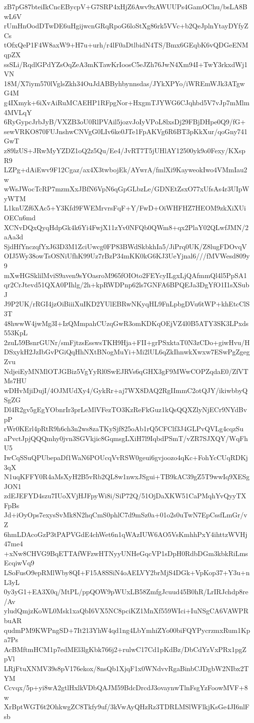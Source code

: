 zB7pG87bteiIkCncEBycpV+G7SRP4xHjZ6Awv9xAWUUPs4GamOChu/bsLA8BwL6V
rUmHnOodDTwDE6uHgijwcnGRqRpoG6loStXg86rk5VVc+b2QeJplnYtayDYfyZCs
tOfxQeP1F4W8axW9+H7u+urh/r4lF0aDtlbidN4TS/Bmx6GEqbK6vQDGeENMqpZX
ssSLi/RqdlGPdYZsOqZeA3mKTawKrIoosC5eJZh76JwN4Xm94I+TwY3rkxdWj1VN
18M/X7iym570lVglsZkh34OuJdABByhbynnsdas/JYkXPYo/iWREmWJk3ATgwG4M
g4IXmyk+6iXvAiRuMCAEHP1RFpgNor+HxgmTJYWG6CJqhbd5V7vJp7mMlm4MVLqY
6RyGypcJrbJyB/VXZB3oU0RlPVAil5jozvJoIyVPoL8lxsDj29FBjDHpe0Q9/fG+
sewVRKO870FUJnshwCNVgG0LIv6ke0JTe1FpAKVg6R6BT3pKkXur/qoGny741GwT
z89lzUS+JRwMyYZDZ1oQ2z5Qu/Ee4/JvRT7T5jUHlAY12500yk9o0Fexy/KXspR9
LZPg+dAiEwv9F12Cgaz/ax4X3twbojEk/AYwrA/fmlXi9KayweokIwo4VMmIau2w
wWsJWocTcRP7mzmXxJBfN6VpN6qGpGLbzLe/GDNEtZsxO77xUfsAs4r3UIpWyWTM
L1knUZf6XAc5+Y3Kfd9FWEMrvrsFqF+Y/FwD+OiWHFHZ7HEOM9zkXiXUiOECn6md
XCNvDQxQyqHdpGk4k6Yi4FwjX11zYv0NFQb0QWm8+qx2PlaY02QLwfJMN/2aAa3d
SjdHfYnczqfYxJ63D3M1ZciUwcg0FP83BWdSkbkhIa5/JiPrq0UK/Z8lugFDOvqV
OIJ5Wy38owTsOSNiUfhK99Uz7rBzP34mKK0kG6KJ3UeYjnal6///fMVWesd809y9
mXwHGSklilMviS9aven9sYOasroM965fOIOto2FEYcyILgxLjQAfmmQl4l5PpSA1
qr2CrJtevd51QXA0PIhlg/2h+kpRWDPnp62ls7GNFA6BPQEJa3DgYfO1I1sXSubJ
J9P2UK/rRGI4jzOiBiiiXuIKD2YUlEBRwNKyqHL9FnLpbgDVu6tWP+khEtcClS3T
48hwwW4jwMg3I+IzQMmpahCUzqGwR3omKDKqOEjVZ4l0B5ATY3SK3LPxds553KpL
2zuL59BsnrGUNr/smFjtzsEsswsTKH9Hja+FII+grPSxktaT0N3zCDo+giwHvu/H
DSxykH2JzIbGvPGiQqHhNXtBNogMuYi+Mi2lUL6qZkIhnwkXwxw7ESwPgZgegZvu
NdjeiEyMNMlOTJGBiz5VgYyRl0SwEJRVs6qGHX3gF9MWwCOPZqdaE0/ZfVTMs7HU
wDHvMjiDujI/4OJMUdXy4/GykRr+aj7WX8DAQ2RgIImmC2otQJY/ikiwbbyQSgZG
Dl4R2gv5gEgYObnrIr3prLeMlVFezTO3KzReFkGuz1kQsQQXZlyNjECr9NYdBvpP
rWr0KErl4pRtR9h6ch3n2ws8zaTKySjf825oAb1rQ5CFClf3J4GLPvQVLg4cqzSu
aPvctJpjQQQmhy0jvn3SGVkjic8GqmsgLXiH7l9IqbdPSmT/vZR7SJXQY/WqFhU5
IwCqSSuQPUbepaDf1WaN6POUcqVvRSW0geui6gvjoozo4qKc+FohYcCUqRDKj3qX
N1uqKFFY0R4aMsXyH2B5vRb2QL8w1nwxJSgui+TB9kAC39gZ5T9wwIq9XESgJON1
zdEJEFYD4szu7IUoXVjHJFpyWi8i/SiP72Q/51OjDaXKW51CaPMqhYvQyyTXFpBs
Jd+iOyOps7exysSvMk8N2hqCmS0phlC7d9mSz0a+01o2s0uTwN7EpCssfLmGr/vZ
6hmLDAcoGzP3tPAPVGdE4chWet6n1qWAzIUW6AO5VsKmhhPxY4ihttzWVHj47me4
+xNw8CHVG9BqETTAfWFzwHTNyyUNHeGqcVP1sDpH0RdbDGm3kbkRiLmsEcqiwVq9
LSoFusO9epRMlWby8QI+F15A8SSiN4oAELVY2brMjS4DGk+VpKop37+Y3u+nL3yL
0y3yG1+EA3X0q/MtPL/ppQOW9pWUxLB58ZmfgJcuud45B0hR/LrIRJchdp8re/Av
yludQmjzKoWL0Msk1xaQbI6VX5NC8pciKZ1MnXf559WIci+IuNSgCA6VAWPRbuAR
qudmPM9KWPngSD+7It213YhW4qd1ng4LbYmhiZYo00biFQYPycrzmxRum1Kpa7Ps
AcBMftmHCM1p7edMEl3lgKbk766j2+rulwC17Cd1pKdBz/DbCdYzVxPRx1pgZpVl
LRjFtuXNMV39s8pV176ekox/8nsQb1XjqF1x0WNdvvRgaBinbCJDgbW2NIbx2TYM
Ccvqx/5p+yi8wA2gtlHxlkVDbQAJM59BdcDrcdJ3ovaynwTlnFsgYzFoowMVF+8w
XrBptWGT6t2OhkwgZC8Tkfy9uf/3kVwAyQHzRz3TDRLMSlWFlkjKsGe4JI6nlFsb
